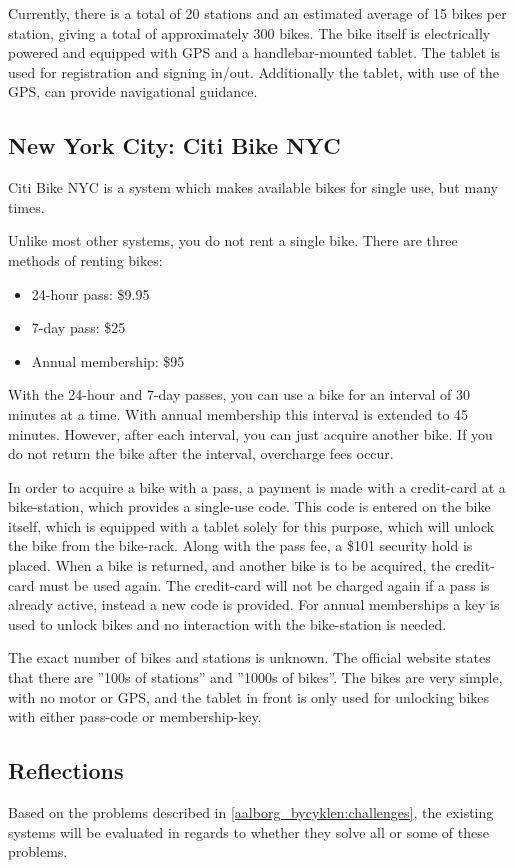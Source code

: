 Currently, there is a total of 20 stations and an estimated average of 15 bikes per station, giving a total of approximately 300 bikes.
The bike itself is electrically powered and equipped with GPS and a handlebar-mounted tablet.
The tablet is used for registration and signing in/out.
Additionally the tablet, with use of the GPS, can provide navigational guidance.

\subsection{New York City: Citi Bike NYC}
Citi Bike NYC\cite{nyc_citibike} is a system which makes available bikes for single use, but many times.

Unlike most other systems, you do not rent a single bike.
There are three methods of renting bikes:

\begin{itemize}
\item 24-hour pass: \$9.95
\item 7-day pass: \$25
\item Annual membership: \$95
\end{itemize}

With the 24-hour and 7-day passes, you can use a bike for an interval of 30 minutes at a time.
With annual membership this interval is extended to 45 minutes.
However, after each interval, you can just acquire another bike.
If you do not return the bike after the interval, overcharge fees occur.

In order to acquire a bike with a pass, a payment is made with a credit-card at a bike-station, which provides a single-use code.
This code is entered on the bike itself, which is equipped with a tablet solely for this purpose, which will unlock the bike from the bike-rack.
Along with the pass fee, a \$101 security hold is placed.
When a bike is returned, and another bike is to be acquired, the credit-card must be used again.
The credit-card will not be charged again if a pass is already active, instead a new code is provided.
For annual memberships a key is used to unlock bikes and no interaction with the bike-station is needed.

The exact number of bikes and stations is unknown.
The official website states that there are ''100s of stations'' and ''1000s of bikes''.
The bikes are very simple, with no motor or GPS, and the tablet in front is only used for unlocking bikes with either pass-code or membership-key.

\subsection{Reflections}
Based on the problems described in \cref{aalborg_bycyklen:challenges}, the existing systems will be evaluated in regards to whether they solve all or some of these problems.

